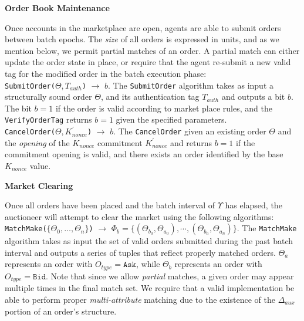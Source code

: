\documentclass[10pt,a4paper]{article}
\theoremstyle{definition}
\begin{document}
\begin{center}
    \textbf{Order Book Maintenance}
\end{center}

Once accounts in the marketplace are open, agents are able to submit orders
between batch epochs. The \emph{size} of all orders is expressed in units, and
as we mention below, we permit partial matches of an order. A partial match can
either update the order state in place, or require that the agent re-submit a
new valid tag for the modified order in the batch execution phase: \\

\texttt{SubmitOrder($\Theta, T_{auth}$)} $\rightarrow$ $b$. The
\texttt{SubmitOrder} algorithm takes as input a structurally sound order
$\Theta$, and its authentication tag $T_{auth}$ and outputs a bit $b$. The bit
$b=1$ if the order is valid according to market place rules, and the
\texttt{VerifyOrderTag} returns $b=1$ given the specified parameters. \\

\texttt{CancelOrder($\Theta, K_{nonce}^\prime$)} $\rightarrow$ $b$. The
\texttt{CancelOrder} given an existing order $\Theta$ and the \emph{opening} of
the $K_{nonce}$ commitment $K_{nonce}^\prime$ and returns $b=1$ if the
commitment opening is valid, and there exists an order identified by the base
$K_{nonce}$ value.

\begin{center}
    \textbf{Market Clearing}
\end{center}

Once all orders have been placed and the batch interval of $\Upsilon$ has
elapsed, the auctioneer will attempt to clear the market using the following
algorithms: \\

\texttt{MatchMake($\{\Theta_0, \ldots, \Theta_n\}$)} $\rightarrow$ $\Phi_b =
\{(\Theta_{b_0}, \Theta_{a_0}), \cdots, (\Theta_{b_n}, \Theta_{a_n})\}$. The
\texttt{MatchMake} algorithm takes as input the set of valid orders submitted
during the past batch interval and outputs a series of tuples that reflect
properly matched orders. $\Theta_a$ represents an order with $O_{type} =
\texttt{Ask}$, while $\Theta_b$ represents an order with $O_{type} =
\texttt{Bid}$. Note that since we allow \emph{partial} matches, a given order
may appear multiple times in the final match set. We require that a valid
implementation be able to perform proper \emph{multi-attribute} matching due to
the existence of the $\Delta_{aux}$ portion of an order's structure. \\
\end{document}
